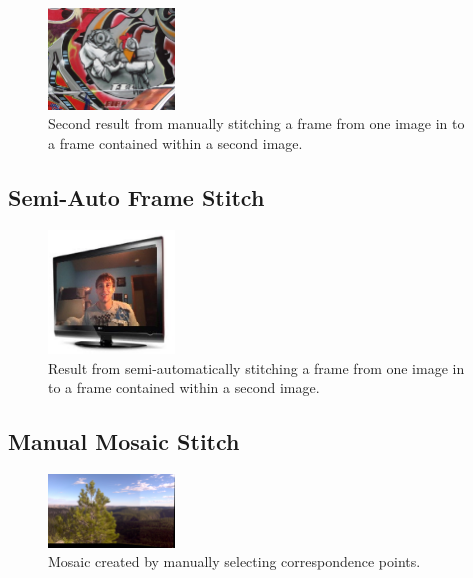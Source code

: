 \documentclass[10pt,twocolumn,letterpaper]{article}
\begin{document}
\begin{figure}[ht!]
\centering
\includegraphics[width=0.3\textwidth]{img/graf_auto_out.eps}
\caption{Second result from manually stitching a frame from one image in to a frame contained within a second image.}
\label{fig:man_frame_graf_res}
\end{figure}

\subsection{Semi-Auto Frame Stitch}

 \begin{figure}[ht!]
 \centering
 \includegraphics[width=0.3\textwidth]{img/tv_auto_out.eps}
 \caption{Result from semi-automatically stitching a frame from one image in to a frame contained within a second image.}
 \label{fig:auto_frame_tv_res}
 \end{figure}
 
 \subsection{Manual Mosaic Stitch}
 
    \begin{figure}[ht!]
    \centering
    \includegraphics[width=0.3\textwidth]{img/man_mos_buzzard.eps}
    \caption{Mosaic created by manually selecting correspondence points.}
    \label{fig:manual_mosaic_res}
    \end{figure}
  
\end{document}
